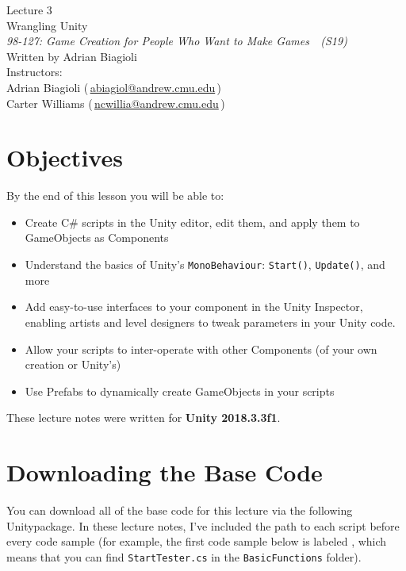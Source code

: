 \documentclass[11pt]{article}
\makeatletter
\newcommand{\lecturenum}{3}
\newcommand{\lecturename}{Wrangling Unity}
\newcommand{\authorname}{Adrian Biagioli}
\newcommand{\coursenum}{98-127}
\newcommand{\coursename}{Game Creation for People Who Want to Make Games}
\newcommand{\coursesem}{S19}
\newcommand{\instructors}{Adrian Biagioli (\,\href{mailto:abiagiol@andrew.cmu.edu}{abiagiol@andrew.cmu.edu}\,) \\ Carter Williams (\,\href{mailto:ncwillia@andrew.cmu.edu}{ncwillia@andrew.cmu.edu}\,)}
\makeatother
\begin{document}
\thispagestyle{plain}
{
    \vspace{1.5em}
    \begin{center}
    {
        \huge
        Lecture \lecturenum \\
        \vspace{0.5em}
        \lecturename
        \vspace{0.4em}
    } \\
    {
        \it
        \coursenum: \coursename\ \ (\coursesem)
    } \\
    \vspace{1.0em}
    Written by \authorname \\
    \vspace{0.7em}
    Instructors:\\ \instructors
    \end{center}
}

\section{Objectives}

By the end of this lesson you will be able to:
\begin{itemize}
    \item Create C\# scripts in the Unity editor, edit them, and apply them to GameObjects as Components
    \item Understand the basics of Unity's \lstinline|MonoBehaviour|: \lstinline|Start()|, 
          \lstinline|Update()|, and more
    \item Add easy-to-use interfaces to your component in the Unity Inspector, enabling artists and
          level designers to tweak parameters in your Unity code.
    \item Allow your scripts to inter-operate with other Components (of your own creation or 
          Unity's)
    \item Use Prefabs to dynamically create GameObjects in your scripts
\end{itemize}

\noindent These lecture notes were written for {\bf Unity 2018.3.3f1}.

\section{Downloading the Base Code}

You can download all of the base code for this lecture via the following Unitypackage.  In these 
lecture notes, I've included the path to each script before every code sample (for example, the 
first code sample below is labeled , which means that you 
can find \lstinline|StartTester.cs| in the \lstinline|BasicFunctions| folder).
\end{document}
